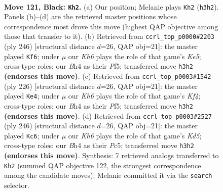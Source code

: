\documentclass[11pt]{article}
\begin{document}
\clearpage

\begin{figure}[p]\centering
\begin{subfigure}{0.46\textwidth}\centering
\resizebox{\linewidth}{!}{%
\newchessgame
\chessboard[
  setfen={1R6/3r3n/8/4p2p/7b/7k/2Kp4/8 b - - 7 121},
  showmover=false,
  pgfstyle=straightmove, color=movearrow, markmove={h3-h2}
]}
\caption{}
\end{subfigure}\hfill
\begin{subfigure}{0.46\textwidth}\centering
\resizebox{\linewidth}{!}{%
\newchessgame
\chessboard[
  setfen={8/7k/7P/4KP2/8/8/7R/1r6 w - - 63 124},
  showmover=false,
  pgfstyle=straightmove, color=movearrow, markmove={e5-f6}
]}
\caption{}
\end{subfigure}
\\[4pt]
\begin{subfigure}{0.46\textwidth}\centering
\resizebox{\linewidth}{!}{%
\newchessgame
\chessboard[
  setfen={8/7k/7P/5P2/5K2/7R/8/1r6 w - - 79 114},
  showmover=false,
  pgfstyle=straightmove, color=movearrow, markmove={f4-e4}
]}
\caption{}
\end{subfigure}\hfill
\begin{subfigure}{0.46\textwidth}\centering
\resizebox{\linewidth}{!}{%
\newchessgame
\chessboard[
  setfen={8/k7/P7/2PK4/8/R7/6r1/8 w - - 87 124},
  showmover=false,
  pgfstyle=straightmove, color=movearrow, markmove={d5-c6}
]}
\caption{}
\end{subfigure}
\caption{\textbf{Move 121, Black: \texttt{Kh2}.} (a) Our position; Melanie plays \texttt{Kh2} (\texttt{h3h2}). Panels (b)--(d) are the retrieved master positions whose correspondence most drove this move (highest QAP objective among those that transfer to it). (b) Retrieved from \texttt{ccrl\_top\_p0000\#2203} (ply 246) [structural distance $d$=26, QAP obj=21]: the master played \texttt{Kf6}; under $\mu$ our \emph{Kh6} plays the role of that game's \emph{Ke5}; cross-type roles: our \emph{B}h4 as their \emph{P}f5; transferred move \texttt{h3h2} \textbf{(endorses this move)}. (c) Retrieved from \texttt{ccrl\_top\_p0003\#1542} (ply 226) [structural distance $d$=26, QAP obj=21]: the master played \texttt{Ke4}; under $\mu$ our \emph{Kh6} plays the role of that game's \emph{Kf4}; cross-type roles: our \emph{B}h4 as their \emph{P}f5; transferred move \texttt{h3h2} \textbf{(endorses this move)}. (d) Retrieved from \texttt{ccrl\_top\_p0003\#2527} (ply 246) [structural distance $d$=26, QAP obj=21]: the master played \texttt{Kc6}; under $\mu$ our \emph{Kh6} plays the role of that game's \emph{Kd5}; cross-type roles: our \emph{B}h4 as their \emph{P}c5; transferred move \texttt{h3h2} \textbf{(endorses this move)}. Synthesis: 7 retrieved analogs transferred to \texttt{Kh2} (summed QAP objective 122, the strongest correspondence among the candidate moves); Melanie committed it via the \texttt{search} selector.}
\label{fig:thought-m241}
\end{figure}
\end{document}
